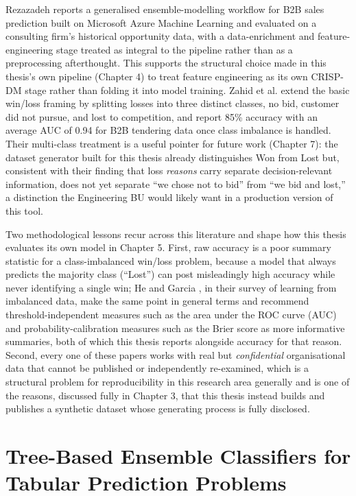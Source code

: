 Rezazadeh \citep{rezazadeh2020generalized} reports a generalised
ensemble-modelling workflow for B2B sales prediction built on Microsoft
Azure Machine Learning and evaluated on a consulting firm's historical
opportunity data, with a data-enrichment and feature-engineering stage
treated as integral to the pipeline rather than as a preprocessing
afterthought. This supports the structural choice made in this thesis's
own pipeline (Chapter 4) to treat feature engineering as its own
CRISP-DM stage rather than folding it into model training. Zahid et al.
\citep{zahid2021predicting} extend the basic win/loss framing by
splitting losses into three distinct classes, no bid, customer did not
pursue, and lost to competition, and report 85\% accuracy with an
average AUC of 0.94 for B2B tendering data once class imbalance is
handled. Their multi-class treatment is a useful pointer for future work
(Chapter 7): the dataset generator built for this thesis already
distinguishes Won from Lost but, consistent with their finding that loss
\emph{reasons} carry separate decision-relevant information, does not
yet separate ``we chose not to bid'' from ``we bid and lost,'' a
distinction the Engineering BU would likely want in a production version
of this tool.

Two methodological lessons recur across this literature and shape how
this thesis evaluates its own model in Chapter 5. First, raw accuracy is
a poor summary statistic for a class-imbalanced win/loss problem,
because a model that always predicts the majority class (``Lost'') can
post misleadingly high accuracy while never identifying a single win; He
and Garcia \citep{he2009learning}, in their survey of learning from
imbalanced data, make the same point in general terms and recommend
threshold-independent measures such as the area under the ROC curve
(AUC) and probability-calibration measures such as the Brier score as
more informative summaries, both of which this thesis reports alongside
accuracy for that reason. Second, every one of these papers works with
real but \emph{confidential} organisational data that cannot be
published or independently re-examined, which is a structural problem
for reproducibility in this research area generally and is one of the
reasons, discussed fully in Chapter 3, that this thesis instead builds
and publishes a synthetic dataset whose generating process is fully
disclosed.

\hypertarget{tree-based-ensemble-classifiers-for-tabular-prediction-problems}{%
\section{Tree-Based Ensemble Classifiers for Tabular Prediction
Problems}\label{tree-based-ensemble-classifiers-for-tabular-prediction-problems}}

